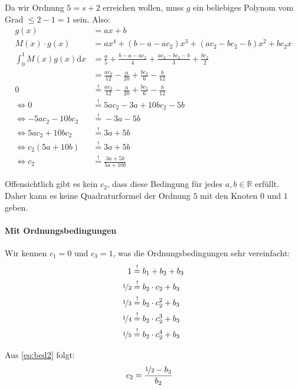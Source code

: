 Da wir Ordnung $5 = s + 2$ erreichen wollen, muss $g$ ein beliebiges
Polynom vom Grad $\leq 2-1 = 1$ sein. Also:
\begin{align}
    g(x) &= ax + b\\
    M(x) \cdot g(x) &= ax^4 + (b-a-ac_2)x^3 + (ac_2-bc_2-b)x^2 + b c_2 x\\
    \int_0^1 M(x) g(x) \mathrm{d} x &= \frac{a}{5} + \frac{b-a-ac_2}{4} + \frac{ac_2 - bc_2-b}{3} + \frac{b c_2}{2}\\
    &= \frac{a c_2}{12}-\frac{a}{20}+\frac{b c_2}{6}-\frac{b}{12}\\
    0 &\stackrel{!}{=}\frac{a c_2}{12}-\frac{a}{20}+\frac{b c_2}{6}-\frac{b}{12}\\
    \Leftrightarrow 0 &\stackrel{!}{=} 5 a c_2 - 3a + 10 b c_2 - 5 b\\
    \Leftrightarrow -5 a c_2 - 10 b c_2&\stackrel{!}{=}  - 3a - 5 b\\
    \Leftrightarrow 5 a c_2 + 10 b c_2&\stackrel{!}{=}  3a + 5 b\\
    \Leftrightarrow c_2(5 a + 10 b)&\stackrel{!}{=}  3a + 5 b\\
    \Leftrightarrow c_2 &\stackrel{!}{=}  \frac{3a + 5 b}{5 a + 10 b}
\end{align}

Offensichtlich gibt es kein $c_2$, dass diese Bedingung für jedes $a,b \in \mathbb{R}$ 
erfüllt. Daher kann es keine Quadraturformel der Ordnung $5$ mit den Knoten
$0$ und $1$ geben.

\paragraph*{Mit Ordnungsbedingungen}
Wir kennen $c_1 = 0$ und $c_3=1$, was die Ordnungsbedingungen
sehr vereinfacht:
\begin{align}
    1 &\stackrel{!}{=} b_1 + b_2 + b_3\\
    \nicefrac{1}{2} &\stackrel{!}{=} b_2 \cdot c_2 + b_3 \label{eq:bed2}\\
    \nicefrac{1}{3} &\stackrel{!}{=} b_2 \cdot c_2^2 + b_3 \label{eq:bed3}\\
    \nicefrac{1}{4} &\stackrel{!}{=} b_2 \cdot c_2^3 + b_3\\
    \nicefrac{1}{5} &\stackrel{!}{=} b_2 \cdot c_2^4 + b_3
\end{align}

Aus \ref{eq:bed2} folgt:
\begin{align}
    c_2 &= \frac{\nicefrac{1}{2} - b_3}{b_2}
\end{align}

